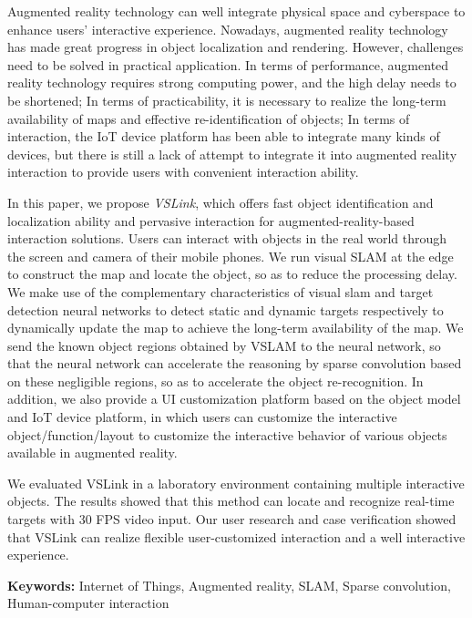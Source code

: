 Augmented reality technology can well integrate physical space and cyberspace to enhance users' interactive experience. Nowadays, augmented reality technology has made great progress in object localization and rendering. However, challenges need to be solved in practical application. In terms of performance, augmented reality technology requires strong computing power, and the high delay needs to be shortened; In terms of practicability, it is necessary to realize the long-term availability of maps and effective re-identification of objects; In terms of interaction, the IoT device platform has been able to integrate many kinds of devices, but there is still a lack of attempt to integrate it into augmented reality interaction to provide users with convenient interaction ability.

In this paper, we propose \textit{VSLink}, which offers fast object identification and localization ability and pervasive interaction for augmented-reality-based interaction solutions. Users can interact with objects in the real world through the screen and camera of their mobile phones.
We run visual SLAM at the edge to construct the map and locate the object, so as to reduce the processing delay. We make use of the complementary characteristics of visual slam and target detection neural networks to detect static and dynamic targets respectively to dynamically update the map to achieve the long-term availability of the map.
We send the known object regions obtained by VSLAM to the neural network, so that the neural network can accelerate the reasoning by sparse convolution based on these negligible regions, so as to accelerate the object re-recognition.
In addition, we also provide a UI customization platform based on the object model and IoT device platform, in which users can customize the interactive object/function/layout to customize the interactive behavior of various objects available in augmented reality.

We evaluated VSLink in a laboratory environment containing multiple interactive objects. The results showed that this method can locate and recognize real-time targets with 30 FPS video input. Our user research and case verification showed that VSLink can realize flexible user-customized interaction and a well interactive experience.

\noindent\textbf{Keywords:} Internet of Things, Augmented reality, SLAM, Sparse convolution, Human-computer interaction